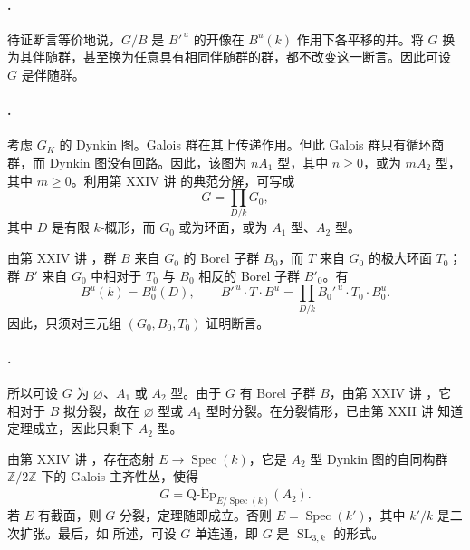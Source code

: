 \paragraph{.}
待证断言等价地说，\(G/B\) 是 \(B'^{\,u}\) 的开像在 \(B^u(k)\) 作用下各平移的并。将 \(G\) 换为其伴随群，甚至换为任意具有相同伴随群的群，都不改变这一断言。因此可设 \(G\) 是伴随群。

\paragraph{.}
考虑 \(G_K\) 的 Dynkin 图。Galois 群在其上传递作用。但此 Galois 群只有循环商群，而 Dynkin 图没有回路。因此，该图为 \(nA_1\) 型，其中 \(n\geq0\)，或为 \(mA_2\) 型，其中 \(m\geq0\)。利用第 XXIV 讲  的典范分解，可写成
\[
 G=\prod_{D/k}G_0,
\]
其中 \(D\) 是有限 \(k\)-概形，而 \(G_0\) 或为环面，或为 \(A_1\) 型、\(A_2\) 型。

由第 XXIV 讲 ，群 \(B\) 来自 \(G_0\) 的 Borel 子群 \(B_0\)，而 \(T\) 来自 \(G_0\) 的极大环面 \(T_0\)；群 \(B'\) 来自 \(G_0\) 中相对于 \(T_0\) 与 \(B_0\) 相反的 Borel 子群 \(B'_0\)。有
\[
 B^{u}(k)=B_0^u(D),\qquad
 B'^{\,u}\cdot T\cdot B^u
 =\prod_{D/k}B_0'^{\,u}\cdot T_0\cdot B_0^u.
\]
因此，只须对三元组 \((G_0,B_0,T_0)\) 证明断言。

\paragraph{.}
所以可设 \(G\) 为 \(\varnothing\)、\(A_1\) 或 \(A_2\) 型。由于 \(G\) 有 Borel 子群 \(B\)，由第 XXIV 讲 ，它相对于 \(B\) 拟分裂，故在 \(\varnothing\) 型或 \(A_1\) 型时分裂。在分裂情形，已由第 XXII 讲  知道定理成立，因此只剩下 \(A_2\) 型。

由第 XXIV 讲 ，存在态射 \(E\to\operatorname{Spec}(k)\)，它是 \(A_2\) 型 Dynkin 图的自同构群 \(\mathbb Z/2\mathbb Z\) 下的 Galois 主齐性丛，使得
\[
 G=\operatorname{Q\text{-}\acute{E}p}_{E/\operatorname{Spec}(k)}
 (A_2).
\]
若 \(E\) 有截面，则 \(G\) 分裂，定理随即成立。否则 \(E=\operatorname{Spec}(k')\)，其中 \(k'/k\) 是二次扩张。最后，如  所述，可设 \(G\) 单连通，即 \(G\) 是 \(\operatorname{SL}_{3,k}\) 的形式。

